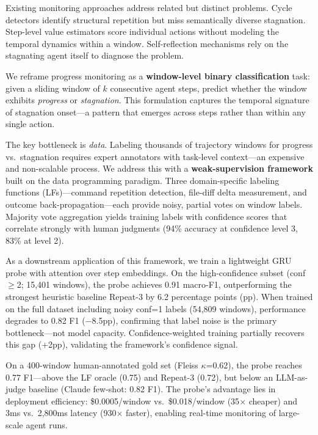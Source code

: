 \documentclass[11pt]{article}
\begin{document}
Existing monitoring approaches address related but distinct problems. Cycle detectors identify structural repetition but miss semantically diverse stagnation. Step-level value estimators score individual actions without modeling the temporal dynamics within a window. Self-reflection mechanisms rely on the stagnating agent itself to diagnose the problem.

We reframe progress monitoring as a \textbf{window-level binary classification} task: given a sliding window of $k$ consecutive agent steps, predict whether the window exhibits \emph{progress} or \emph{stagnation}. This formulation captures the temporal signature of stagnation onset---a pattern that emerges across steps rather than within any single action.

The key bottleneck is \emph{data}. Labeling thousands of trajectory windows for progress vs.\ stagnation requires expert annotators with task-level context---an expensive and non-scalable process. We address this with a \textbf{weak-supervision framework} built on the data programming paradigm. Three domain-specific labeling functions (LFs)---command repetition detection, file-diff delta measurement, and outcome back-propagation---each provide noisy, partial votes on window labels. Majority vote aggregation yields training labels with confidence scores that correlate strongly with human judgments (94\% accuracy at confidence level 3, 83\% at level 2).

As a downstream application of this framework, we train a lightweight GRU probe with attention over step embeddings. On the high-confidence subset (conf$\geq$2; 15,401 windows), the probe achieves 0.91 macro-F1, outperforming the strongest heuristic baseline Repeat-3 by 6.2 percentage points (pp). When trained on the full dataset including noisy conf=1 labels (54,809 windows), performance degrades to 0.82 F1 ($-$8.5pp), confirming that label noise is the primary bottleneck---not model capacity. Confidence-weighted training partially recovers this gap (+2pp), validating the framework's confidence signal.

On a 400-window human-annotated gold set (Fleiss $\kappa$=0.62), the probe reaches 0.77 F1---above the LF oracle (0.75) and Repeat-3 (0.72), but below an LLM-as-judge baseline (Claude few-shot: 0.82 F1). The probe's advantage lies in deployment efficiency: \$0.0005/window vs.\ \$0.018/window (35$\times$ cheaper) and 3ms vs.\ 2,800ms latency (930$\times$ faster), enabling real-time monitoring of large-scale agent runs.
\end{document}
